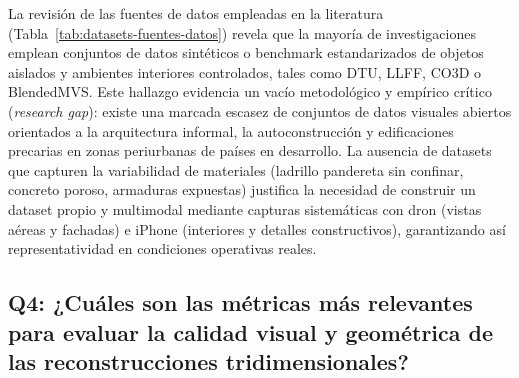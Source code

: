 \documentclass[12pt,oneside]{report}
\begin{document}
La revisión de las fuentes de datos empleadas en la literatura (Tabla~\ref{tab:datasets-fuentes-datos}) revela que la mayoría de investigaciones emplean conjuntos de datos sintéticos o benchmark estandarizados de objetos aislados y ambientes interiores controlados, tales como DTU, LLFF, CO3D o BlendedMVS. Este hallazgo evidencia un vacío metodológico y empírico crítico (\textit{research gap}): existe una marcada escasez de conjuntos de datos visuales abiertos orientados a la arquitectura informal, la autoconstrucción y edificaciones precarias en zonas periurbanas de países en desarrollo. La ausencia de datasets que capturen la variabilidad de materiales (ladrillo pandereta sin confinar, concreto poroso, armaduras expuestas) justifica la necesidad de construir un dataset propio y multimodal mediante capturas sistemáticas con dron (vistas aéreas y fachadas) e iPhone (interiores y detalles constructivos), garantizando así representatividad en condiciones operativas reales.\par

\subsection{Q4: ¿Cuáles son las métricas más relevantes para evaluar la calidad visual y geométrica de las reconstrucciones tridimensionales?}
\end{document}
